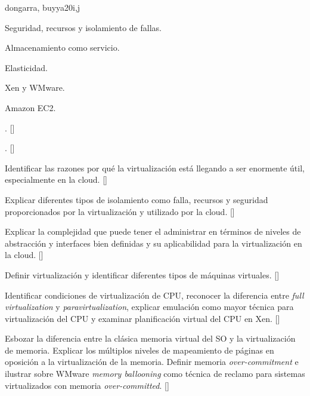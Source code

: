 \begin{syllabus}
\begin{unit}{\PDCloudComputing}{}{dongarra, buyya}{20}{i,j}
\begin{topics}
    \item \PDCloudComputingTopicVirtualization
    \item Seguridad, recursos y isolamiento de fallas.
    \item Almacenamiento como servicio.
    \item Elasticidad.
    \item Xen y WMware.
    \item Amazon EC2.
\end{topics}
\begin{learningoutcomes}
    \item \PDCloudComputingTopicVirtualization. [\Familiarity]
    \item \PDCloudComputingLOExplainTheDisadvantages. [\Familiarity]
    \item Identificar las razones por qué la virtualización está llegando a ser enormente útil, especialmente en la cloud. [\Familiarity]
    \item Explicar diferentes tipos de isolamiento como falla, recursos y seguridad proporcionados por la virtualización y utilizado por la cloud. [\Familiarity]
    \item Explicar la complejidad que puede tener el administrar en términos de niveles de abstracción y interfaces bien definidas y su aplicabilidad para la virtualización en la cloud.  [\Familiarity]
    \item Definir virtualización y identificar diferentes tipos de máquinas virtuales. [\Familiarity]
    \item Identificar condiciones de virtualización de CPU, reconocer la diferencia entre {\em full virtualization} y {\em paravirtualization}, explicar emulación como mayor técnica para virtualización del CPU y examinar planificación virtual del CPU en Xen. [\Familiarity]
    \item Esbozar la diferencia entre la clásica memoria virtual del SO y la virtualización de memoria. Explicar los múltiplos niveles de mapeamiento de páginas en oposición a la virtualización de la memoria. Definir memoria {\em over-commitment} e ilustrar sobre WMware {\em memory ballooning} como técnica de reclamo para sistemas virtualizados con memoria {\em over-committed}. [\Familiarity]
\end{learningoutcomes}
\end{unit}


\end{syllabus}
